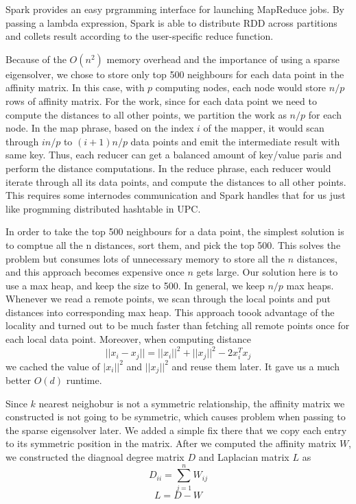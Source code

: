 \documentclass{acm_proc_article-sp}
\begin{document}
Spark provides an easy prgramming interface for launching MapReduce jobs. By passing a lambda expression, Spark is able to distribute RDD across partitions and collets result according to the user-specific reduce function. 

Because of the $O(n^2)$ memory overhead and the importance of using a sparse eigensolver, we chose to store only top 500 neighbours for each data point in the affinity matrix. In this case, with $p$ computing nodes, each node would store $n/p$ rows of affinity matrix. For the work, since for each data point we need to compute the distances to all other points, we partition the work as $n/p$ for each node. In the map phrase, based on the index $i$ of the mapper, it would scan through $in/p$ to $(i+1)n/p$ data points and emit the intermediate result with same key. Thus, each reducer can get a balanced amount of key/value paris and perform the distance computations. In the reduce phrase, each reducer would iterate through all its data points, and compute the distances to all other points. This requires some internodes communication and Spark handles that for us just like progmming distributed hashtable in UPC.

In order to take the top 500 neighbours for a data point, the simplest solution is to comptue all the n distances, sort them, and pick the top 500. This solves the problem but consumes lots of unnecessary memory to store all the $n$ distances, and this approach becomes expensive once $n$ gets large. Our solution here is to use a max heap, and keep the size to 500. In general, we keep $n/p$ max heaps. Whenever we read a remote points, we scan through the local points and put distances into corresponding max heap. This approach toook advantage of the locality and turned out to be much faster than fetching all remote points once for each local data point. Moreover, when computing distance $$||x_i - x_j|| = ||x_i||^2 + ||x_j||^2 - 2x_i^Tx_j$$
we cached the value of $|x_i||^2$ and $||x_j||^2$ and reuse them later. It gave us a much better $O(d)$ runtime. 

Since $k$ nearest neighobur is not a symmetric relationship, the affinity matrix we constructed is not going to be symmetric, which causes problem when passing to the sparse eigensolver later. We added a simple fix there that we copy each entry to its symmetric position in the matrix. After we computed the affinity matrix $W$, we constructed the diagnoal degree matrix $D$ and Laplacian matrix $L$ as 
$$ D_{ii} = \sum_{j=1}^nW_{ij}$$
$$ L = D - W$$
\end{document}

